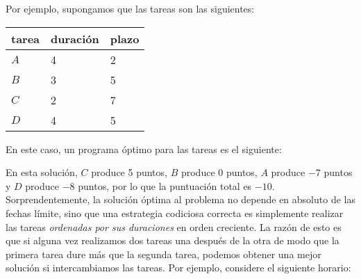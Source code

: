 Por ejemplo, supongamos que las tareas son las siguientes:
\begin{center}
\begin{tabular}{lll}
tarea & duración & plazo \\
\hline
$A$ & 4 & 2 \\
$B$ & 3 & 5 \\
$C$ & 2 & 7 \\
$D$ & 4 & 5 \\
\end{tabular}
\end{center}
En este caso, un programa óptimo para las tareas
es el siguiente:
\begin{center}
\end{center}
En esta solución, $C$ produce 5 puntos,
$B$ produce 0 puntos, $A$ produce $-7$ puntos
y $D$ produce $-8$ puntos,
por lo que la puntuación total es $-10$.
Sorprendentemente, la solución óptima al problema
no depende en absoluto de las fechas límite,
sino que una estrategia codiciosa correcta es simplemente
realizar las tareas \emph{ordenadas por sus duraciones}
en orden creciente.
La razón de esto es que si alguna vez realizamos
dos tareas una después de la otra de modo que la primera tarea
dure más que la segunda tarea,
podemos obtener una mejor solución si intercambiamos las tareas.
Por ejemplo, considere el siguiente horario:
\begin{center}
\end{center}
